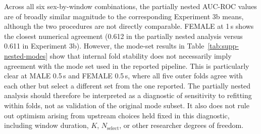 \documentclass[preprint,12pt]{elsarticle}
\begin{document}
Across all six sex-by-window combinations, the partially nested AUC-ROC values are of broadly
similar magnitude to the corresponding Experiment 3b means, although the two procedures are not
directly comparable. FEMALE at 1\,s shows the closest numerical agreement (0.612 in the partially
nested analysis versus 0.611 in Experiment 3b). However, the mode-set results in
Table~\ref{tab:supp-nested-modes} show that internal fold stability does not necessarily imply
agreement with the mode set used in the reported pipeline. This is particularly clear at
MALE 0.5\,s and FEMALE 0.5\,s, where all five outer folds agree with each other but select a
different set from the one reported. The partially nested analysis should therefore be interpreted
as a diagnostic of sensitivity to refitting within folds, not as validation of the original mode
subset. It also does not rule out optimism arising from upstream choices held fixed in this
diagnostic, including window duration, $K$, $N_{\text{select}}$, or other researcher degrees of
freedom.
\end{document}
